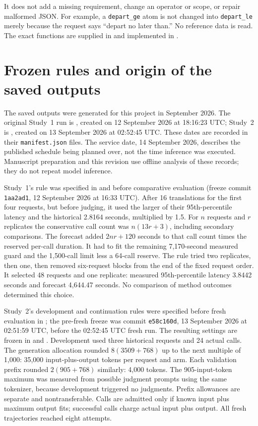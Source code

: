 \documentclass[11pt,a4paper]{scrartcl}
\begin{document}
It does not add a missing requirement, change an operator or scope, or repair malformed JSON. For example, a \texttt{depart\_ge} atom is not changed into \texttt{depart\_le} merely because the request says ``depart no later than.'' No reference data is read. The exact functions are supplied in  and implemented in .

\section{Frozen rules and origin of the saved outputs}
The saved outputs were generated for this project in September 2026. The original Study~1 run is , created on 12 September 2026 at 18:16:23 UTC; Study~2 is , created on 13 September 2026 at 02:52:45 UTC. These dates are recorded in their \texttt{manifest.json} files. The service date, 14 September 2026, describes the published schedule being planned over, not the time inference was executed. Manuscript preparation and this revision use offline analysis of these records; they do not repeat model inference.

Study~1's rule was specified in  and  before comparative evaluation (freeze commit \texttt{1aa2ad1}, 12 September 2026 at 16:33 UTC). After 16 translations for the first four requests, but before judging, it used the larger of their 95th-percentile latency and the historical 2.8164 seconds, multiplied by 1.5. For $n$ requests and $r$ replicates the conservative call count was $n(13r+3)$, including secondary comparisons. The forecast added $2nr+120$ seconds to that call count times the reserved per-call duration. It had to fit the remaining 7,170-second measured guard and the 1,500-call limit less a 64-call reserve. The rule tried two replicates, then one, then removed six-request blocks from the end of the fixed request order. It selected 48 requests and one replicate: measured 95th-percentile latency 3.8442 seconds and forecast 4,644.47 seconds. No comparison of method outcomes determined this choice.

Study~2's development and continuation rules were specified before fresh evaluation in ; the pre-fresh freeze was commit \texttt{e58c160d}, 13 September 2026 at 02:51:59 UTC, before the 02:52:45 UTC fresh run. The resulting settings are frozen in  and . Development used three historical requests and 24 actual calls. The generation allocation rounded $8(3509+768)$ up to the next multiple of 1,000: 35,000 input-plus-output tokens per request and arm. Each validation prefix rounded $2(905+768)$ similarly: 4,000 tokens. The 905-input-token maximum was measured from possible judgment prompts using the same tokenizer, because development triggered no judgments. Prefix allowances are separate and nontransferable. Calls are admitted only if known input plus maximum output fits; successful calls charge actual input plus output. All fresh trajectories reached eight attempts.
\end{document}

